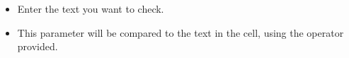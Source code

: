 
\begin{itemize}
\item Enter the text you want to check. 
\item This parameter will be compared to the text in the cell, using the operator provided.
\end{itemize}
